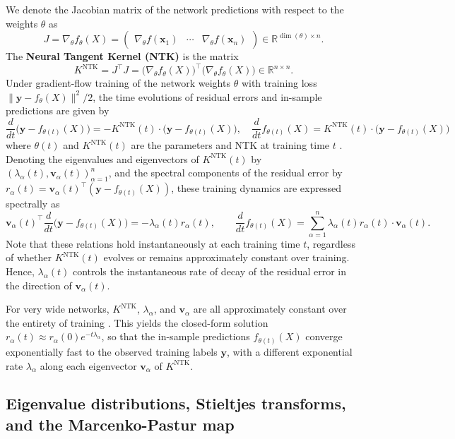 \documentclass{article}
\theoremstyle{definition}
\newcommand{\R}{\mathbb{R}}
\newcommand{\NTK}{\text{NTK}}
\newcommand{\x}{\mathbf{x}}
\newcommand{\y}{\mathbf{y}}
\renewcommand{\v}{\mathbf{v}}
\renewcommand{\a}{\alpha}
\newcommand{\1}{\mathbf{1}}
\begin{document}
We denote the Jacobian matrix
of the network predictions with respect to the weights $\theta$ as
\[J=\nabla_\theta f_\theta(X)=
\begin{pmatrix} \nabla_\theta f(\x_1) & \cdots & \nabla_\theta f(\x_n)
\end{pmatrix} \in \R^{\dim(\theta) \times n}.\]
The {\bf Neural Tangent Kernel (NTK)} is the matrix
\begin{equation}\label{eq:NTK}
K^{\NTK}=J^\top J=\big(\nabla_\theta f_\theta(X)\big)^\top
\big(\nabla_\theta f_\theta(X)\big) \in \R^{n \times n}.
\end{equation}
Under gradient-flow training of the network weights $\theta$ with
training loss $\|\y-f_\theta(X)\|^2/2$,
the time evolutions of residual errors and in-sample predictions are given by
\begin{equation}\label{eq:training}
\frac{d}{dt}\Big(\y-f_{\theta(t)}(X)\Big)=-K^\NTK(t) \cdot
\Big(\y-f_{\theta(t)}(X)\Big), \quad
\frac{d}{dt}f_{\theta(t)}(X)
=K^\NTK(t) \cdot \Big(\y-f_{\theta(t)}(X)\Big)
\end{equation}
where $\theta(t)$ and $K^\NTK(t)$ are the parameters and NTK at
training time $t$ \cite{jacot2018neural,du2019gradienta}.
Denoting the eigenvalues and eigenvectors of $K^\NTK(t)$
by $(\lambda_\a(t),\v_\a(t))_{\a=1}^n$, and the spectral components of the
residual error by $r_\a(t)=\v_\a(t)^\top (\y-f_{\theta(t)}(X))$,
these training dynamics are expressed spectrally as
\[\v_\a(t)^\top \frac{d}{dt}
\Big(\y-f_{\theta(t)}(X)\Big)=-\lambda_\a(t)r_\a(t), \qquad
\frac{d}{dt}f_{\theta(t)}(X)=
\sum_{\a=1}^n \lambda_\a(t)r_\a(t) \cdot \v_\a(t).\]
Note that these relations hold instantaneously at each training time $t$,
regardless of whether $K^\NTK(t)$ evolves or remains approximately constant over
training. Hence, $\lambda_\a(t)$ controls the instantaneous rate of decay
of the residual error in the direction of $\v_\a(t)$.

For very wide networks, 
$K^\NTK$, $\lambda_\a$, and $\v_\a$ are all approximately constant over the
entirety of training
\cite{jacot2018neural,du2019gradienta,du2019gradientb,allen2019convergence,chizat2019lazy}.
This yields the closed-form solution
$r_\a(t) \approx r_\a(0)e^{-t \lambda_\a}$,
so that the in-sample predictions $f_{\theta(t)}(X)$ converge 
exponentially fast to the observed training labels $\y$, with a different
exponential rate $\lambda_\a$ along each eigenvector $\v_\a$ of $K^\NTK$.

\subsection{Eigenvalue distributions, Stieltjes transforms,
and the Marcenko-Pastur map}\label{sec:stieltjes}
\end{document}
